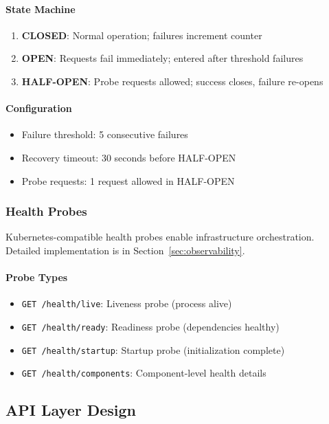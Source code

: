 \paragraph{State Machine}
\begin{enumerate}
    \item \textbf{CLOSED}: Normal operation; failures increment counter
    \item \textbf{OPEN}: Requests fail immediately; entered after threshold failures
    \item \textbf{HALF-OPEN}: Probe requests allowed; success closes, failure re-opens
\end{enumerate}

\paragraph{Configuration}
\begin{itemize}
    \item Failure threshold: 5 consecutive failures
    \item Recovery timeout: 30 seconds before HALF-OPEN
    \item Probe requests: 1 request allowed in HALF-OPEN
\end{itemize}

\subsubsection{Health Probes}

Kubernetes-compatible health probes enable infrastructure orchestration. Detailed implementation is in Section~\ref{sec:observability}.

\paragraph{Probe Types}
\begin{itemize}
    \item \texttt{GET /health/live}: Liveness probe (process alive)
    \item \texttt{GET /health/ready}: Readiness probe (dependencies healthy)
    \item \texttt{GET /health/startup}: Startup probe (initialization complete)
    \item \texttt{GET /health/components}: Component-level health details
\end{itemize}

\subsection{API Layer Design}
\label{subsec:api-design}

